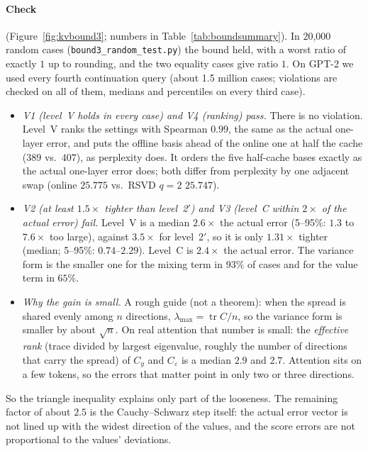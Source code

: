 \documentclass[10pt]{article}
\theoremstyle{plain}
\theoremstyle{definition}
\theoremstyle{remark}
\DeclareMathOperator{\tr}{tr}
\newcommand{\rl}[1]{\textsf{#1}}%
\begin{document}
\paragraph{Check} (Figure~\ref{fig:kvbound3}; numbers in Table~\ref{tab:boundsummary}). In 20{,}000 random cases (\texttt{bound3\_random\_test.py}) the bound held, with a worst ratio of exactly $1$ up to rounding, and the two equality cases give ratio $1$. On GPT-2 we used every fourth continuation query (about 1.5 million cases; violations are checked on all of them, medians and percentiles on every third case).
\begin{itemize}[leftmargin=2em,itemsep=1pt]
\item \emph{\rl{V1} (level~V holds in every case) and \rl{V4} (ranking) pass.} There is no violation. Level~V ranks the settings with Spearman $0.99$, the same as the actual one-layer error, and puts the offline basis ahead of the online one at half the cache ($389$ vs.\ $407$), as perplexity does. It orders the five half-cache bases exactly as the actual one-layer error does; both differ from perplexity by one adjacent swap (online $25.775$ vs.\ RSVD $q=2$ $25.747$).
\item \emph{\rl{V2} (at least $1.5\times$ tighter than level~2$'$) and \rl{V3} (level~C within $2\times$ of the actual error) fail.} Level~V is a median $2.6\times$ the actual error (5--95\%: $1.3$ to $7.6\times$ too large), against $3.5\times$ for level~2$'$, so it is only $1.31\times$ tighter (median; 5--95\%: $0.74$--$2.29$). Level~C is $2.4\times$ the actual error. The variance form is the smaller one for the mixing term in $93\%$ of cases and for the value term in $65\%$.
\item \emph{Why the gain is small.} A rough guide (not a theorem): when the spread is shared evenly among $n$ directions, $\lambda_{\max}=\tr C/n$, so the variance form is smaller by about $\sqrt n$. On real attention that number is small: the \emph{effective rank} (trace divided by largest eigenvalue, roughly the number of directions that carry the spread) of $C_y$ and $C_\varepsilon$ is a median $2.9$ and $2.7$. Attention sits on a few tokens, so the errors that matter point in only two or three directions.
\end{itemize}
So the triangle inequality explains only part of the looseness. The remaining factor of about $2.5$ is the Cauchy--Schwarz step itself: the actual error vector is not lined up with the widest direction of the values, and the score errors are not proportional to the values' deviations.
\end{document}
